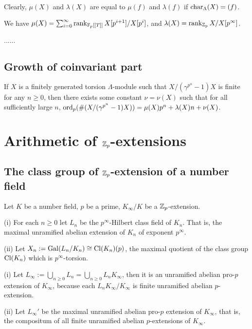 Clearly, $\mu(X)$ and $\lambda(X)$ are equal to
$\mu(f)$ and $\lambda(f)$ if $\operatorname{char}_\Lambda(X)=(f)$.

\begin{prop}
\label{iwasawa-mod-invariants-2}
We have $\mu(X)=\sum_{i=0}^\infty\operatorname{rank}_{{\mathbb {F}}_p[[T]]}X[p^{i+1}]/X[p^i]$,
and $\lambda(X)=\operatorname{rank}_{{\mathbb {Z}}_p}X/X[p^\infty]$.
\end{prop}

......

\subsection{Growth of coinvariant part}

\begin{prop}
\label{coinvariant-growth}
If $X$ is a finitely generated torsion
$\Lambda$-module such that $X/(\gamma^{p^n}-1)X$ is finite
for any $n\geq 0$, then
there exists some constant $\nu=\nu(X)$
such that for all sufficiently large $n$,
$\operatorname{ord}_p(\#(X/(\gamma^{p^n}-1)X))=\mu(X)p^n
+\lambda(X)n+\nu(X)$.
\end{prop}

\section{Arithmetic of ${\mathbb {Z}}_p$-extensions}

\subsection{The class group of ${\mathbb {Z}}_p$-extension of a number field}

Let $K$ be a number field, $p$ be a prime,
$K_\infty/K$ be a ${\mathbb {Z}}_p$-extension.

\begin{definition}
\label{Zp-ext-Ln}
{\rm(i)}
For each $n\geq 0$ let $L_n$ be the $p^\infty$-Hilbert class field of $K_n$.
That is, the maximal unramified abelian extension of $K_n$ of exponent $p^\infty$.

{\rm(ii)}
Let $X_n:={\mathrm{Gal}}(L_n/K_n)\cong{\mathrm{Cl}}(K_n)(p)$,
the maximal quotient of the class group ${\mathrm{Cl}}(K_n)$ which is $p^\infty$-torsion.
\end{definition}

\begin{definition}
\label{Zp-ext-L-inf}
{\rm(i)}
Let $L_\infty:=\bigcup_{n\geq 0}L_n=\bigcup_{n\geq 0}L_nK_\infty$,
then it is an unramified abelian pro-$p$ extension of $K_\infty$,
because each $L_nK_\infty/K_\infty$ is finite unramified abelian $p$-extension.

{\rm(ii)}
Let $L_\infty'$ be the maximal unramified abelian pro-$p$ extension of $K_\infty$,
that is, the compositum of all finite unramified abelian $p$-extensions of $K_\infty$.
\end{definition}

